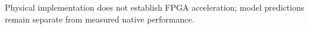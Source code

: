 Physical implementation does not establish FPGA acceleration; model predictions remain separate from measured native performance.

